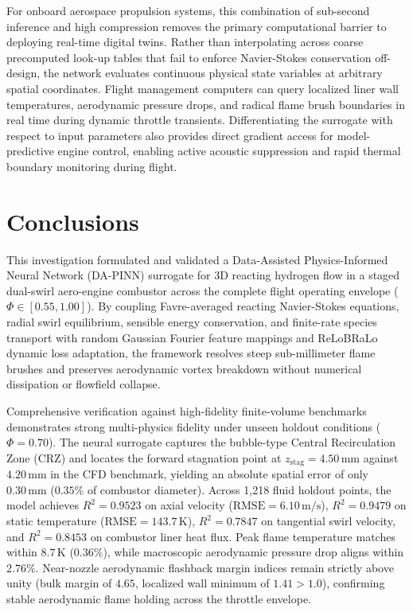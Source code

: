 \documentclass[reprint,aps,prfluids,superscriptaddress,twocolumn,floatfix]{revtex4-2}
\begin{document}
For onboard aerospace propulsion systems, this combination of sub-second inference and high compression removes the primary computational barrier to deploying real-time digital twins. Rather than interpolating across coarse precomputed look-up tables that fail to enforce Navier-Stokes conservation off-design, the network evaluates continuous physical state variables at arbitrary spatial coordinates. Flight management computers can query localized liner wall temperatures, aerodynamic pressure drops, and radical flame brush boundaries in real time during dynamic throttle transients. Differentiating the surrogate with respect to input parameters also provides direct gradient access for model-predictive engine control, enabling active acoustic suppression and rapid thermal boundary monitoring during flight.



\newpage
\section{Conclusions}
\label{sec:conclusions}

This investigation formulated and validated a Data-Assisted Physics-Informed Neural Network (DA-PINN) surrogate for 3D reacting hydrogen flow in a staged dual-swirl aero-engine combustor across the complete flight operating envelope ($\Phi \in [0.55, 1.00]$). By coupling Favre-averaged reacting Navier-Stokes equations, radial swirl equilibrium, sensible energy conservation, and finite-rate species transport with random Gaussian Fourier feature mappings and ReLoBRaLo dynamic loss adaptation, the framework resolves steep sub-millimeter flame brushes and preserves aerodynamic vortex breakdown without numerical dissipation or flowfield collapse.

Comprehensive verification against high-fidelity finite-volume benchmarks demonstrates strong multi-physics fidelity under unseen holdout conditions ($\Phi = 0.70$). The neural surrogate captures the bubble-type Central Recirculation Zone (CRZ) and locates the forward stagnation point at $z_{\text{stag}} = 4.50\,\text{mm}$ against $4.20\,\text{mm}$ in the CFD benchmark, yielding an absolute spatial error of only $0.30\,\text{mm}$ ($0.35\%$ of combustor diameter). Across 1,218 fluid holdout points, the model achieves $R^2 = 0.9523$ on axial velocity ($\text{RMSE} = 6.10\,\text{m/s}$), $R^2 = 0.9479$ on static temperature ($\text{RMSE} = 143.7\,\text{K}$), $R^2 = 0.7847$ on tangential swirl velocity, and $R^2 = 0.8453$ on combustor liner heat flux. Peak flame temperature matches within $8.7\,\text{K}$ ($0.36\%$), while macroscopic aerodynamic pressure drop aligns within $2.76\%$. Near-nozzle aerodynamic flashback margin indices remain strictly above unity (bulk margin of $4.65$, localized wall minimum of $1.41 > 1.0$), confirming stable aerodynamic flame holding across the throttle envelope.
\end{document}
